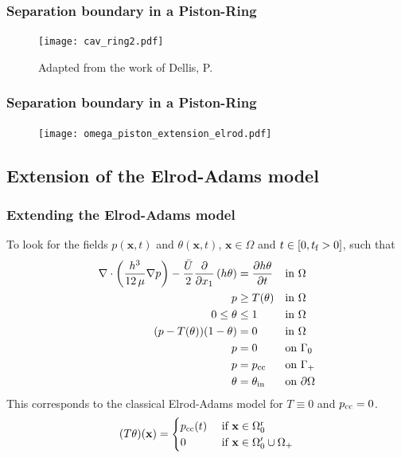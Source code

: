 \documentclass[10pt,aspectratio=169]{beamer}
\begin{document}
\begin{frame}[noframenumbering]
\frametitle{Separation boundary in a Piston-Ring}
\vspace*{1.0cm}
\begin{figure}
	\centering
	\texttt{[image: cav\_ring2.pdf]}
		\caption{\color{ExecusharesGrey}\tiny Adapted from the work of Dellis, P.}
\end{figure}
\end{frame}

\begin{frame}
\frametitle{Separation boundary in a Piston-Ring}
\vspace*{1.0cm}
\begin{figure}
	\centering
	\texttt{[image: omega\_piston\_extension\_elrod.pdf]}
\end{figure}
\end{frame}

\subsection{Extension of the Elrod-Adams model}
\begin{frame}
\tableofcontents[
currentsection,
currentsubsection,
subsectionstyle=show/shaded/hide
]
\end{frame}
\begin{frame}
\frametitle{Extending the Elrod-Adams model}
\vspace*{1.0cm}
To look for the fields $p(\textbf{x},t)$ and $\theta(\textbf{x},t)$, $\textbf{x}\in\Omega$ and $t\in[0,t_\textnormal{f}>0]$, such that
\begin{align*}
\nabla\cdot \left( \frac{h^3}{12\,\mu} \nabla p \right)-\frac{\bar{U}}{2}\frac{\partial }{\partial x_1}\left(h\theta\right) &=\frac{\partial h\theta }{\partial t} &&\text{in } \Omega\\
p&\geq T(\theta)&&\text{in } \Omega\\
0\leq \theta &\leq 1&&\text{in } \Omega\\
(p-T(\theta))(1-\theta)&=0 && \text{in } \Omega\\
p &= 0 && \text{on } \Gamma_0\\
p &= p_{\textnormal{\scriptsize{cc}}} && \text{on } \Gamma_+\\
\theta &= \theta_{\textnormal{in}} && \text{on } \partial\Omega
\end{align*} 
This corresponds to the classical Elrod-Adams model for $T\equiv 0$ and $p_{\textnormal{\scriptsize{cc}}}=0$.
\begin{equation*}
(T\theta)(\mathbf{x})=
\begin{cases}
p_{\textnormal{\scriptsize{cc}}}(t)  & \text{ if } \mathbf{x}\in \Omega_0^\textnormal{r}\\
0 				& \text{ if } \mathbf{x} \in \Omega_0'\cup \Omega_+
\end{cases}
\end{equation*}
\end{frame}
\end{document}
